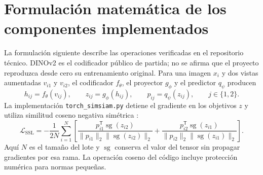 \section{Formulación matemática de los componentes implementados}

La formulación siguiente describe las operaciones verificadas en el repositorio técnico. DINOv2 es el codificador público de partida; no se afirma que el proyecto reproduzca desde cero su entrenamiento original. Para una imagen $x_i$ y dos vistas aumentadas $v_{i1}$ y $v_{i2}$, el codificador $f_\theta$, el proyector $g_\phi$ y el predictor $q_\psi$ producen
\begin{equation}
 h_{ij}=f_\theta(v_{ij}),\qquad z_{ij}=g_\phi(h_{ij}),\qquad p_{ij}=q_\psi(z_{ij}),\qquad j\in\{1,2\}.
\end{equation}
La implementación \texttt{torch\_simsiam.py} detiene el gradiente en los objetivos $z$ y utiliza similitud coseno negativa simétrica \parencite{chen2021simsiam}:
\begin{equation}
 \mathcal L_{\mathrm{SSL}}=-\frac{1}{2N}\sum_{i=1}^{N}\left[
 \frac{p_{i1}^{\mathsf T}\operatorname{sg}(z_{i2})}{\|p_{i1}\|_2\|\operatorname{sg}(z_{i2})\|_2}
 +\frac{p_{i2}^{\mathsf T}\operatorname{sg}(z_{i1})}{\|p_{i2}\|_2\|\operatorname{sg}(z_{i1})\|_2}\right].
\end{equation}
Aquí $N$ es el tamaño del lote y $\operatorname{sg}$ conserva el valor del tensor sin propagar gradientes por esa rama. La operación coseno del código incluye protección numérica para normas pequeñas.


